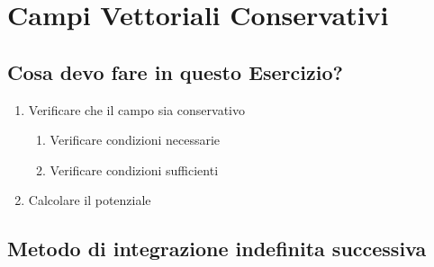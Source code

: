 \chapter{Campi Vettoriali Conservativi}
\section{Cosa devo fare in questo Esercizio?}
\begin{enumerate}
    \item Verificare che il campo sia conservativo 
    \begin{enumerate}
        \item Verificare condizioni necessarie
        \item Verificare condizioni sufficienti
    \end{enumerate}
    \item Calcolare il potenziale
\end{enumerate}

\section{Metodo di integrazione indefinita successiva}
